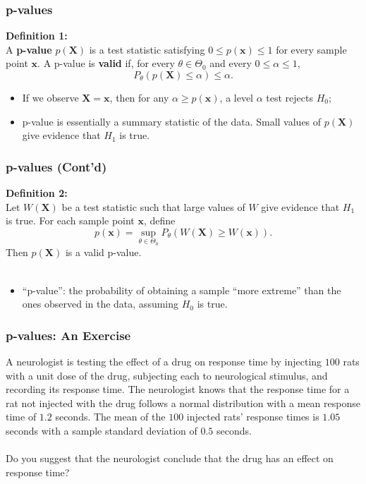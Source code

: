 \documentclass{beamer}
\begin{document}
\begin{frame}
\frametitle{p-values}
\textbf{Definition 1:}\\
A \textbf{p-value} $p(\mathbf{X})$ is a test statistic satisfying $0 \leq p(\mathbf{x}) \leq 1$ for every sample point $\mathbf{x}$. A p-value is \textbf{valid} if, for every $\theta \in \Theta_0$ and every $0 \leq \alpha \leq 1$,
$$
P_{\theta}(p(\mathbf{X}) \leq \alpha) \leq \alpha.
$$
\begin{itemize}
\item If we observe $\mathbf{X} = \mathbf{x}$, then for any $\alpha \geq p(\mathbf{x})$, a level $\alpha$ test rejects $H_0$;
\item p-value is essentially a summary statistic of the data. Small values of $p(\mathbf{X})$ give evidence that $H_1$ is true.
\end{itemize}
\end{frame}

\begin{frame}
\frametitle{p-values (Cont'd)}
\textbf{Definition 2:}\\
Let $W(\mathbf{X})$ be a test statistic such that large values of $W$ give evidence that $H_1$ is true. For each sample point $\mathbf{x}$, define
$$
p(\mathbf{x}) = \sup_{\theta \in \Theta_0} P_{\theta}(W(\mathbf{X}) \geq W(\mathbf{x})).
$$
Then $p(\mathbf{X})$ is a valid p-value.
\\~\\
\begin{itemize}
\item ``p-value'': the probability of obtaining a sample ``more extreme'' than the ones observed in the data, assuming $H_0$ is true.
\end{itemize}
\end{frame}

\begin{frame}
\frametitle{p-values: An Exercise}
A neurologist is testing the effect of a drug on response time by injecting $100$ rats with a unit dose of the drug, subjecting each to neurological stimulus, and recording its response time. The neurologist knows that the response time for a rat not injected with the drug follows a normal distribution with a mean response time of $1.2$ seconds. The mean of the $100$ injected rats' response times is $1.05$ seconds with a sample standard deviation of $0.5$ seconds. 
\\~\\
Do you suggest that the neurologist conclude that the drug has an effect on response time?
\end{frame}
\end{document}
